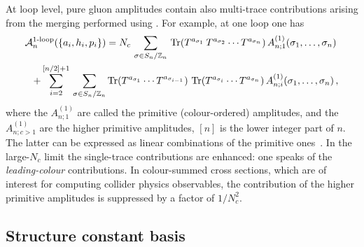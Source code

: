 At loop level, pure gluon amplitudes contain also multi-trace contributions arising from 
the merging performed using . For example, at one loop one has
\begin{align}
\begin{split}
\label{leading-colour-one-loop}
\mathcal{A}_{n}^{\text{1-loop}}(\{ a_{i}, h_{i},p_{i}\}) &=  N_c\,
 \sum_{\sigma\in S_{n}/\mathbb{Z}_{n}}\,
\mathop{\mathrm{Tr}}(T^{a_{\sigma_{1}}}\, T^{a_{\sigma_{2}}}\cdots T^{a_{\sigma_{n}}} )\, 
A_{n;1}^{(1)}(\sigma_{1}, 
\ldots , \sigma_{n} ) \\
+ \sum_{i=2}^{[n/2]+1}\, \sum_{\sigma\in S_n/\mathbb{Z}_n} &
\mathop{\mathrm{Tr}}(T^{a_{\sigma_{1}}} \cdots T^{a_{\sigma_{i-1}}} )\,
\mathop{\mathrm{Tr}}(T^{a_{\sigma_{i}}}\cdots T^{a_{\sigma_{n}}})\, 
A_{n;i}^{(1)}(\sigma_{1}, \ldots , \sigma_{n}  )\, ,
\end{split}
\end{align}
where the $A_{n;1}^{(1)}$ are called the primitive (colour-ordered) amplitudes, and the 
$A_{n;c>1}^{(1)}$ are the higher primitive amplitudes, $[n]$ is the lower integer part of $n$. The latter can be expressed as linear
combinations of the primitive ones~\cite{ch1_Bern:1990ux}. 
In the large-$N_{c}$ limit the single-trace 
contributions are enhanced: one speaks of the \emph{leading-colour} contributions. In colour-summed cross sections, which are of interest for computing 
collider physics observables, the contribution of the higher primitive amplitudes is suppressed by a factor of $1/N_{c}^2$.

\subsection{Structure constant basis}

